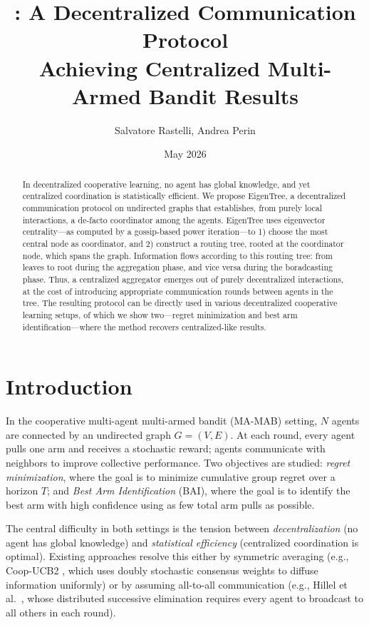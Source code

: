 \documentclass{article}
\title{\merw: A Decentralized Communication Protocol\\Achieving Centralized Multi-Armed Bandit Results}
\author{Salvatore Rastelli, Andrea Perin}
\date{May 2026}
\newcommand{\merw}{EigenTree}
\begin{document}
\maketitle

\begin{abstract}
	In decentralized cooperative learning, no agent has global knowledge, and yet centralized coordination is statistically efficient.
	We propose \merw{}, a decentralized communication protocol on undirected graphs that establishes, from purely local interactions, a de-facto coordinator among the agents.
	\merw{} uses eigenvector centrality---as computed by a gossip-based power iteration---to 1) choose the most central node as coordinator, and 2) construct a routing tree, rooted at the coordinator node, which spans the graph.
	Information flows according to this routing tree: from leaves to root during the aggregation phase, and vice versa during the boradcasting phase.
	Thus, a centralized aggregator emerges out of purely decentralized interactions, at the cost of introducing appropriate communication rounds between agents in the tree.
	The resulting protocol can be directly used in various decentralized cooperative learning setups, of which we show two---regret minimization and best arm identification---where the method recovers centralized-like results.
\end{abstract}

\section{Introduction}

In the cooperative multi-agent multi-armed bandit (MA-MAB) setting, $N$ agents are connected by an undirected graph $G = (V, E)$. At each round, every agent pulls one arm and receives a stochastic reward; agents communicate with neighbors to improve collective performance. Two objectives are studied: \emph{regret minimization}, where the goal is to minimize cumulative group regret over a horizon $T$; and \emph{Best Arm Identification} (BAI), where the goal is to identify the best arm with high confidence using as few total arm pulls as possible.

The central difficulty in both settings is the tension between \emph{decentralization} (no agent has global knowledge) and \emph{statistical efficiency} (centralized coordination is optimal). Existing approaches resolve this either by symmetric averaging (e.g., Coop-UCB2 \cite{landgren2021distributed}, which uses doubly stochastic consensus weights to diffuse information uniformly) or by assuming all-to-all communication (e.g., Hillel et al.\ \cite{hillel2013distributed}, whose distributed successive elimination requires every agent to broadcast to all others in each round).
\end{document}

